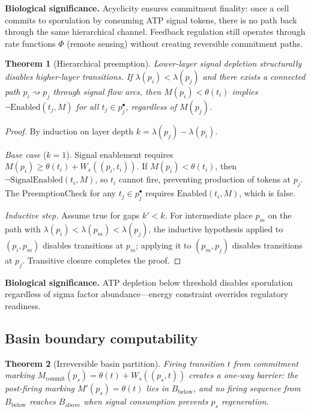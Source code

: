 \documentclass[11pt,a4paper]{article}
\theoremstyle{plain}
\newtheorem{theorem}{Theorem}
\theoremstyle{definition}
\begin{document}
\textbf{Biological significance.} Acyclicity ensures commitment finality: once a cell commits to sporulation by consuming ATP signal tokens, there is no path back through the same hierarchical channel. Feedback regulation still operates through rate functions $\Phi$ (remote sensing) without creating reversible commitment paths.

\begin{theorem}[Hierarchical preemption]\label{thm:preemption}
Lower-layer signal depletion structurally disables higher-layer transitions. If $\lambda(p_i) < \lambda(p_j)$ and there exists a connected path $p_i \rightsquigarrow p_j$ through signal flow arcs, then $M(p_i) < \theta(t_i)$ implies $\neg\mathrm{Enabled}(t_j, M)$ for all $t_j \in p_j^\bullet$, regardless of $M(p_j)$.
\end{theorem}

\begin{proof}
By induction on layer depth $k = \lambda(p_j) - \lambda(p_i)$.

\emph{Base case} ($k=1$). Signal enablement requires $M(p_i) \geq \theta(t_i) + W_s((p_i,t_i))$. If $M(p_i) < \theta(t_i)$, then $\neg\mathrm{SignalEnabled}(t_i,M)$, so $t_i$ cannot fire, preventing production of tokens at $p_j$. The PreemptionCheck for any $t_j \in p_j^\bullet$ requires $\mathrm{Enabled}(t_i,M)$, which is false.

\emph{Inductive step.} Assume true for gaps $k' < k$. For intermediate place $p_m$ on the path with $\lambda(p_i) < \lambda(p_m) < \lambda(p_j)$, the inductive hypothesis applied to $(p_i,p_m)$ disables transitions at $p_m$; applying it to $(p_m,p_j)$ disables transitions at $p_j$. Transitive closure completes the proof.
\end{proof}

\textbf{Biological significance.} ATP depletion below threshold disables sporulation regardless of sigma factor abundance---energy constraint overrides regulatory readiness.

\subsection{Basin boundary computability}

\begin{theorem}[Irreversible basin partition]\label{thm:basin}
Firing transition $t$ from commitment marking $M_{\mathrm{commit}}(p_s) = \theta(t) + W_s((p_s,t))$ creates a one-way barrier: the post-firing marking $M'(p_s) = \theta(t)$ lies in $B_{\mathrm{below}}$, and no firing sequence from $B_{\mathrm{below}}$ reaches $B_{\mathrm{above}}$ when signal consumption prevents $p_s$ regeneration.
\end{theorem}
\end{document}
